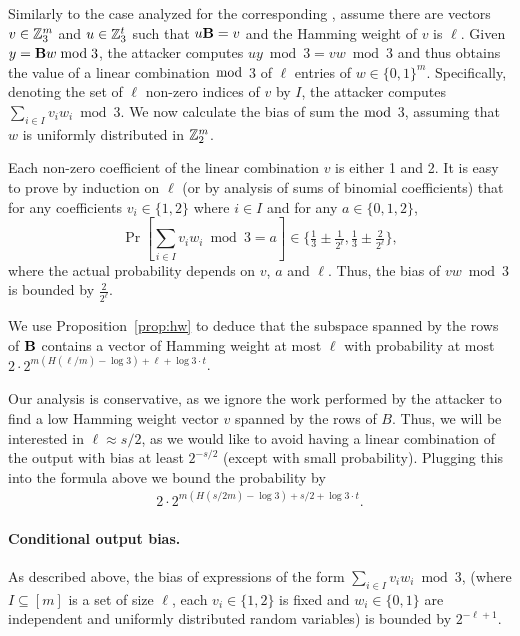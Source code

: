 Similarly to the case analyzed for the corresponding \ttOWF, assume there are vectors $v \in \mathbb{Z}_3^m$ and $u \in \mathbb{Z}_3^t$ such that $u \mat{B} = v$ and the Hamming weight of $v$ is $\ell$. Given $y = \mat{B}w \bmod 3$, the attacker computes $uy \bmod 3 = vw \bmod 3$ and thus obtains the value of a linear combination $\bmod$ 3 of $\ell$ entries of $w \in \{0,1\}^m$.
Specifically, denoting the set of $\ell$ non-zero indices of $v$ by $I$, the attacker computes $\sum_{i \in I} v_i w_i \bmod 3$.
We now calculate the bias of sum the $\bmod $ 3, assuming that $w$ is uniformly distributed in $\mathbb{Z}_2^m$.

Each non-zero coefficient of the linear combination $v$ is either 1 and 2.
It is easy to prove by induction on $\ell$ (or by analysis of sums of binomial coefficients) that
for any coefficients $v_i \in \{1,2\}$ where $i \in I$ and for any $a \in \{0,1,2\}$,
$$\Pr\left[\sum_{i \in I} v_i w_i \bmod 3 = a\right] \in \{\tfrac{1}{3} \pm \tfrac{1}{2^\ell}, \tfrac{1}{3} \pm \tfrac{2}{2^\ell}\},$$
where the actual probability depends on $v$, $a$ and $\ell$. Thus, the bias of $vw \bmod 3$ is bounded by $\tfrac{2}{2^\ell}$.

We use Proposition~\ref{prop:hw} to deduce
that the subspace spanned by the rows of $\mat{B}$ contains a vector of Hamming weight at most $\ell$ with probability at most
$2 \cdot 2^{m (H(\ell/m) - \log 3) + \ell + \log 3 \cdot t}$.

Our analysis is conservative, as we ignore the work performed
by the attacker to find a low Hamming weight vector $v$ spanned by the rows of $B$.
Thus, we will be interested in $\ell \approx s/2$,
as we would like to avoid having a linear combination of the output with bias at least $2^{-s/2}$
(except with small probability).
Plugging this into the formula above we bound the probability by
\begin{align}
\label{eq:bias}
2 \cdot 2^{m (H(s/2m) - \log 3) + s/2 + \log 3 \cdot t}.
\end{align}

\paragraph{Conditional output bias.}
As described above, the bias of expressions of the form $\sum_{i \in I} v_i w_i \bmod 3$,
(where $I \subseteq [m]$ is a set of size $\ell$, each $v_i \in \{1,2\}$ is fixed and $w_i \in \{0,1\}$
are independent and uniformly distributed random variables) is bounded by $2^{-\ell+1}$.

